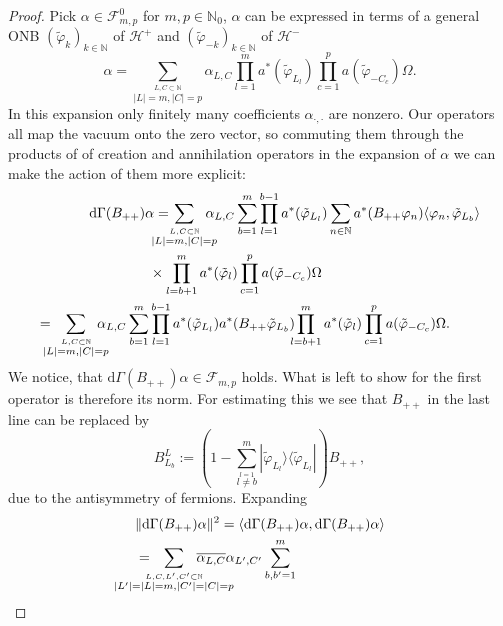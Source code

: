 \documentclass[b5paper,draft,openbib,12pt]{memoir}
\begin{document}
\begin{proof}
Pick \(\alpha\in\mathcal{F}^0_{m,p}\) for \(m,p\in\mathbb{N}_0\), \(\alpha\) can be expressed in terms of a general ONB 
\((\tilde{\varphi}_k)_{k\in\mathbb{N}}\) of \(\mathcal{H}^+\) and \((\tilde{\varphi}_{-k})_{k\in\mathbb{N}}\) of \(\mathcal{H}^-\)
\begin{equation}
\alpha=\sum_{\overset{L,C\subset \mathbb{N}}{|L|=m,|C|=p}}\!\!\!\!\!\!\alpha_{L,C} \prod_{l=1}^m a^*(\tilde{\varphi}_{L_l}) \prod_{c=1}^p a(\tilde{\varphi}_{-C_c}) \Omega.
\end{equation}
In this expansion only finitely many coefficients \(\alpha_{\cdot, \cdot}\) are nonzero. Our operators all map the vacuum onto the zero vector, so commuting them 
through the products of of creation and annihilation operators in the expansion of \(\alpha\) we can make the action of them more explicit:
\begin{align}\nonumber
\mathrm{d}\Gamma(B_{++}) \alpha =\hspace{-0.5cm} &\sum_{\overset{L,C\subset \mathbb{N}}{|L|=m,|C|=p}}\!\!\!\!\!\!\alpha_{L,C} \sum_{b=1}^m 
\prod_{l=1}^{b-1} a^*(\tilde{\varphi}_{L_l})  \sum_{n\in\mathbb{N}} a^*(B_{++}\varphi_n) \langle \varphi_n, \tilde{\varphi}_{L_b}\rangle \\
&\times \prod_{l=b+1}^m a^*(\tilde{\varphi}_{l}) \prod_{c=1}^p a(\tilde{\varphi}_{-C_c}) \Omega\\
=\!\!\!\!\!\sum_{\overset{L,C\subset \mathbb{N}}{|L|=m,|C|=p}}\!\!\!\!\!\!\alpha_{L,C} \sum_{b=1}^m 
&\prod_{l=1}^{b-1} a^*(\tilde{\varphi}_{L_l})  a^*(B_{++} \tilde{\varphi}_{L_b})  \!\!\!
\prod_{l=b+1}^m a^*(\tilde{\varphi}_{l}) \prod_{c=1}^p a(\tilde{\varphi}_{-C_c}) \Omega.
\end{align}
We notice, that \(\mathrm{d}\Gamma(B_{++})\alpha \in \mathcal{F}_{m,p}\) holds. What is left to show for the first operator is therefore
its norm. For estimating this we see that \(B_{++}\) in the last line can be replaced by 
\begin{equation}
B^L_{L_b}:=\left(1-\sum_{\overset{l=1}{l\neq b}}^m |\tilde{\varphi}_{L_l}\rangle \langle \tilde{\varphi}_{L_l}|\right) B_{++},
\end{equation}
due to the antisymmetry of fermions. Expanding 
\begin{align}\nonumber
&\|\mathrm{d}\Gamma(B_{++})\alpha\|^2 = \langle \mathrm{d}\Gamma(B_{++})\alpha, \mathrm{d}\Gamma(B_{++})\alpha \rangle \\\nonumber
&= \hspace{-1cm}\sum_{\overset{L,C, L',C'\subset \mathbb{N}}{|L'|=|L|=m,|C'|=|C|=p}}\hspace{-1cm}\overline{\alpha_{L,C}}\alpha_{L',C'} \sum_{b,b'=1}^m 

\end{align}
\end{proof}
\end{document}
